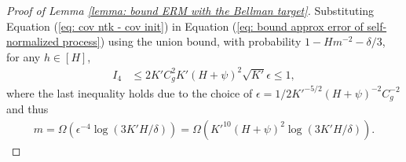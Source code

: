 \documentclass{article} \usepackage{iclr2023/iclr2023_conference,times}
\begin{document}
\begin{proof}[Proof of Lemma \ref{lemma: bound ERM with the Bellman target}]
Substituting Equation (\ref{eq: cov ntk - cov init}) in Equation (\ref{eq: bound approx error of self-normalized process}) using the union bound, with probability $1 - H m^{-2} - \delta / 3$, for any $h \in [H]$, 
\begin{align}
    I_4 &\leq 2 K' C_g^2  K' (H + \psi)^2 \sqrt{K'} \epsilon \leq 1,
    \label{eq: bound I4 in self-normalized process proof}
\end{align}
where the last inequality holds due to the choice of $\epsilon = 1/2 K'^{-5/2} (H + \psi)^{-2} C_g^{-2} $ and thus 
\begin{align*}
    m = \Omega(\epsilon^{-4} \log(3 K'H/\delta)) = \Omega \left( K'^{10} (H + \psi)^2 \log(3 K'H/\delta)\right).
\end{align*}




\end{proof}
\end{document}

